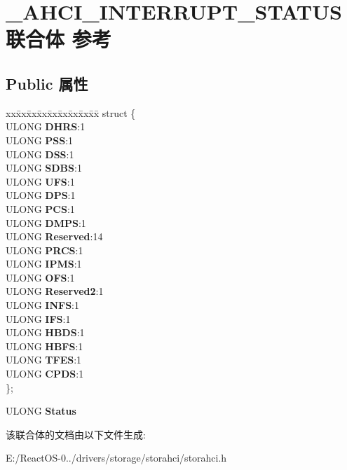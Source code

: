 \hypertarget{union___a_h_c_i___i_n_t_e_r_r_u_p_t___s_t_a_t_u_s}{}\section{\+\_\+\+A\+H\+C\+I\+\_\+\+I\+N\+T\+E\+R\+R\+U\+P\+T\+\_\+\+S\+T\+A\+T\+U\+S联合体 参考}
\label{union___a_h_c_i___i_n_t_e_r_r_u_p_t___s_t_a_t_u_s}
\subsection*{Public 属性}
\begin{DoxyCompactItemize}
\item 
\mbox{\label{union___a_h_c_i___i_n_t_e_r_r_u_p_t___s_t_a_t_u_s_a5194af13a94147a76f8d455f8b0ca267}} 
\begin{tabbing}
xx\=xx\=xx\=xx\=xx\=xx\=xx\=xx\=xx\=\kill
struct \{\\
\>ULONG {\bfseries DHRS}:1\\
\>ULONG {\bfseries PSS}:1\\
\>ULONG {\bfseries DSS}:1\\
\>ULONG {\bfseries SDBS}:1\\
\>ULONG {\bfseries UFS}:1\\
\>ULONG {\bfseries DPS}:1\\
\>ULONG {\bfseries PCS}:1\\
\>ULONG {\bfseries DMPS}:1\\
\>ULONG {\bfseries Reserved}:14\\
\>ULONG {\bfseries PRCS}:1\\
\>ULONG {\bfseries IPMS}:1\\
\>ULONG {\bfseries OFS}:1\\
\>ULONG {\bfseries Reserved2}:1\\
\>ULONG {\bfseries INFS}:1\\
\>ULONG {\bfseries IFS}:1\\
\>ULONG {\bfseries HBDS}:1\\
\>ULONG {\bfseries HBFS}:1\\
\>ULONG {\bfseries TFES}:1\\
\>ULONG {\bfseries CPDS}:1\\
\}; \\

\end{tabbing}\item 
\mbox{\label{union___a_h_c_i___i_n_t_e_r_r_u_p_t___s_t_a_t_u_s_aa31b27d47933acad8949784ea21ab970}} 
U\+L\+O\+NG {\bfseries Status}
\end{DoxyCompactItemize}


该联合体的文档由以下文件生成\+:\begin{DoxyCompactItemize}
\item 
E\+:/\+React\+O\+S-\/0../drivers/storage/storahci/storahci.\+h\end{DoxyCompactItemize}
